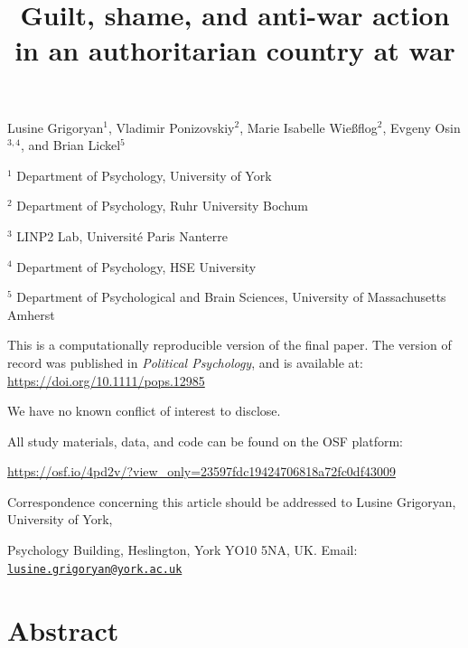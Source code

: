 \documentclass[
]{article}
\title{Guilt, shame, and anti-war action in an authoritarian country at war}
\author{}
\date{\vspace{-2.5em}}
\begin{document}
\maketitle

\fancyhead[RH]{}

\vspace{10mm}
\begin{center}
Lusine Grigoryan$^{1}$, Vladimir Ponizovskiy$^{2}$, Marie Isabelle Wießflog$^{2}$, Evgeny Osin$^{3,4}$, and Brian Lickel$^{5}$
\vspace{30mm}

$^{1}$ Department of Psychology, University of York
\vspace{5mm}

$^{2}$ Department of Psychology, Ruhr University Bochum
\vspace{5mm}

$^{3}$ LINP2 Lab, Université Paris Nanterre
\vspace{5mm}

$^{4}$ Department of Psychology, HSE University
\vspace{5mm}

$^{5}$ Department of Psychological and Brain Sciences, University of Massachusetts Amherst
\vspace{40mm}

\end{center}

\noindent This is a computationally reproducible version of the final paper. The version of record was published in \emph{Political Psychology}, and is available at: \url{https://doi.org/10.1111/pops.12985}

\vspace{10mm}

\noindent We have no known conflict of interest to disclose.

\noindent All study materials, data, and code can be found on the OSF platform:

\noindent \url{https://osf.io/4pd2v/?view_only=23597fdc19424706818a72fc0df43009}

\noindent Correspondence concerning this article should be addressed to Lusine Grigoryan, University of York,

\noindent Psychology Building, Heslington, York YO10 5NA, UK. Email: \href{mailto:lusine.grigoryan@york.ac.uk}{\nolinkurl{lusine.grigoryan@york.ac.uk}}

\pagebreak

\section*{Abstract}\label{abstract}
\end{document}
